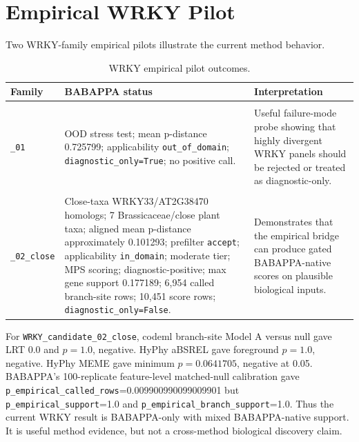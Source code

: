 \documentclass[11pt,a4paper]{article}
\begin{document}
\section{Empirical WRKY Pilot}

Two WRKY-family empirical pilots illustrate the current method behavior.

\begin{longtable}{p{}p{}p{}}
\caption{WRKY empirical pilot outcomes.}
\label{tab:wrky}\\
\toprule
\textbf{Family} & \textbf{BABAPPA status} & \textbf{Interpretation} \\
\midrule
\begin{tabular}[t]{@{}l@{}}\texttt{WRKY\_candidate}\\\texttt{\_01}\end{tabular} & OOD stress test; mean p-distance 0.725799; applicability \texttt{out\_of\_domain}; \texttt{diagnostic\_only=True}; no positive call. & Useful failure-mode probe showing that highly divergent WRKY panels should be rejected or treated as diagnostic-only. \\
\begin{tabular}[t]{@{}l@{}}\texttt{WRKY\_candidate}\\\texttt{\_02\_close}\end{tabular} & Close-taxa WRKY33/AT2G38470 homologs; 7 Brassicaceae/close plant taxa; aligned mean p-distance approximately 0.101293; prefilter \texttt{accept}; applicability \texttt{in\_domain}; moderate tier; MPS scoring; diagnostic-positive; max gene support 0.177189; 6,954 called branch-site rows; 10,451 score rows; \texttt{diagnostic\_only=False}. & Demonstrates that the empirical bridge can produce gated BABAPPA-native scores on plausible biological inputs. \\
\bottomrule
\end{longtable}

For \texttt{WRKY\_candidate\_02\_close}, codeml branch-site Model A versus null gave LRT 0.0 and $p=1.0$, negative. HyPhy aBSREL gave foreground $p=1.0$, negative. HyPhy MEME gave minimum $p=0.0641705$, negative at 0.05. BABAPPA's 100-replicate feature-level matched-null calibration gave \texttt{p\_empirical\_called\_rows}=0.009900990099009901 but \texttt{p\_empirical\_support}=1.0 and \texttt{p\_empirical\_branch\_support}=1.0. Thus the current WRKY result is BABAPPA-only with mixed BABAPPA-native support. It is useful method evidence, but not a cross-method biological discovery claim.
\end{document}
